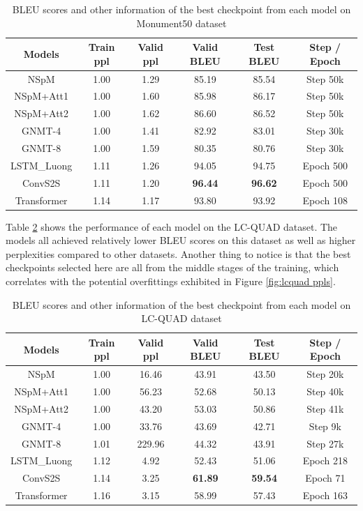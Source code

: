 \begin{table}[H]
\centering
\caption{BLEU scores and other information of the best checkpoint from each model on Monument50 dataset}
\label{table:monu50 bleu}
\begin{tabular}{c|c|c|c|c|c}
Models & Train ppl & Valid ppl & \textbf{Valid BLEU} & \textbf{Test BLEU} & Step / Epoch \\
\hline
NSpM & 1.00 & 1.29 & 85.19 & 85.54 & Step 50k \\
NSpM+Att1 & 1.00 & 1.60 & 85.98 & 86.17 & Step 50k \\
NSpM+Att2 & 1.00 & 1.62 & 86.60 & 86.52 & Step 50k \\
GNMT-4 & 1.00 & 1.41 & 82.92 & 83.01 & Step 30k \\
GNMT-8 & 1.00 & 1.59 & 80.35 & 80.76 & Step 30k \\
LSTM\_Luong & 1.11 & 1.26 & 94.05 & 94.75 & Epoch 500 \\
ConvS2S & 1.11 & 1.20 & \textbf{96.44} & \textbf{96.62} & Epoch 500 \\
Transformer & 1.14 & 1.17 & 93.80 & 93.92 & Epoch 108 \\
\end{tabular}
\end{table}

Table \ref{table:lc-quad bleu} shows the performance of each model on the LC-QUAD dataset. The models all achieved relatively lower BLEU scores on this dataset as well as higher perplexities compared to other datasets. Another thing to notice is that the best checkpoints selected here are all from the middle stages of the training, which correlates with the potential overfittings exhibited in Figure \ref{fig:lcquad ppls}.

\begin{table}[H]
\centering
\caption{BLEU scores and other information of the best checkpoint from each model on LC-QUAD dataset}
\label{table:lc-quad bleu}
\begin{tabular}{c|c|c|c|c|c}
Models & Train ppl & Valid ppl & \textbf{Valid BLEU} & \textbf{Test BLEU} & Step / Epoch \\
\hline
NSpM & 1.00 & 16.46 & 43.91 & 43.50 & Step 20k \\
NSpM+Att1 & 1.00 & 56.23 & 52.68 & 50.13 & Step 40k \\
NSpM+Att2 & 1.00 & 43.20 & 53.03 & 50.86 & Step 41k \\
GNMT-4 & 1.00 & 33.76 & 43.69 & 42.71 & Step 9k \\
GNMT-8 & 1.01 & 229.96 & 44.32 & 43.91 & Step 27k \\
LSTM\_Luong & 1.12 & 4.92 & 52.43 & 51.06 & Epoch 218 \\
ConvS2S & 1.14 & 3.25 & \textbf{61.89} & \textbf{59.54} & Epoch 71 \\
Transformer & 1.16 & 3.15 & 58.99 & 57.43 & Epoch 163 \\
\end{tabular}
\end{table}

